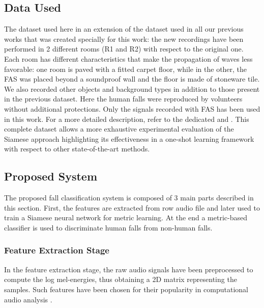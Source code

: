 \subsection{Data Used}
The dataset used here in an extension of the dataset used in all our previous works that was created specially for this work: the new recordings have been performed in 2 different rooms (R1 and R2) with respect to the original one. Each room has different characteristics that make the propagation of waves less favorable: one room is paved with a fitted carpet floor, while in the other, the FAS was placed beyond a soundproof wall and the floor is made of stoneware tile. We also recorded other objects and background types in addition to those present in the previous dataset. Here the human falls were reproduced by volunteers without additional protections. Only the signals recorded with FAS has been used in this work. For a more detailed description, refer to the dedicated  and .
This complete dataset allows a more exhaustive experimental evaluation of the Siamese approach highlighting its effectiveness in a one-shot learning framework with respect to other state-of-the-art methods.

\subsection{Proposed System}
The proposed fall classification system is composed of 3 main parts described in this section.
First, the features are extracted from row audio file and later used to train a Siamese neural network for metric learning. At the end a metric-based classifier is used to discriminate human falls from non-human falls.

\subsubsection{Feature Extraction Stage}
In the feature extraction stage, the raw audio signals have been preprocessed to compute the log mel-energies, thus obtaining a 2D matrix representing the samples.
Such features have been chosen for their popularity in computational audio analysis \cite{gemmeke2013exemplar, mesaros2010acoustic, parascandolo2017convolutional}.


